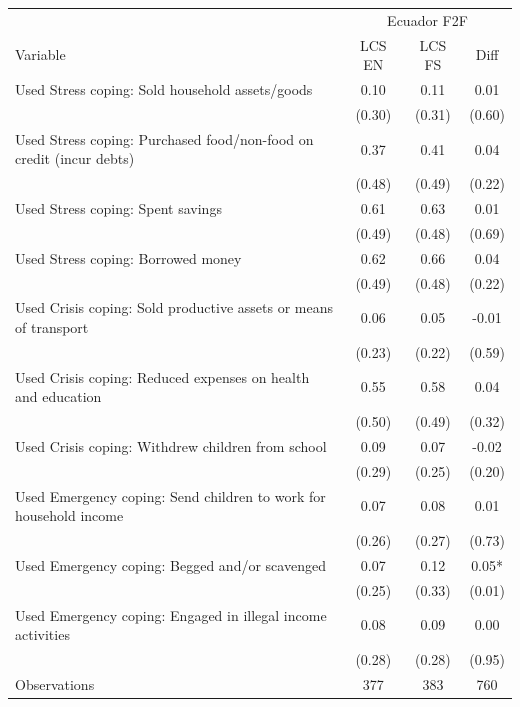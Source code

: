 \begin{tabular}{l*{3}c}
\hline\hline
 & \multicolumn{3}{c}{Ecuador F2F}\\ 
Variable & LCS EN & LCS FS & Diff \\
\hline
Used Stress coping: Sold household assets/goods&0.10&0.11&0.01\\
&(0.30)&(0.31)&(0.60)\\
Used Stress coping: Purchased food/non-food on credit (incur debts)&0.37&0.41&0.04\\
&(0.48)&(0.49)&(0.22)\\
Used Stress coping: Spent savings&0.61&0.63&0.01\\
&(0.49)&(0.48)&(0.69)\\
Used Stress coping: Borrowed money&0.62&0.66&0.04\\
&(0.49)&(0.48)&(0.22)\\
Used Crisis coping: Sold productive assets or means of transport&0.06&0.05&-0.01\\
&(0.23)&(0.22)&(0.59)\\
Used Crisis coping: Reduced expenses on health and education&0.55&0.58&0.04\\
&(0.50)&(0.49)&(0.32)\\
Used Crisis coping: Withdrew children from school&0.09&0.07&-0.02\\
&(0.29)&(0.25)&(0.20)\\
Used Emergency coping: Send children to work for household income&0.07&0.08&0.01\\
&(0.26)&(0.27)&(0.73)\\
Used Emergency coping: Begged and/or scavenged&0.07&0.12&0.05*\\
&(0.25)&(0.33)&(0.01)\\
Used Emergency coping: Engaged in illegal income activities&0.08&0.09&0.00\\
&(0.28)&(0.28)&(0.95)\\
\hline
Observations & 377 & 383 & 760 \\
\hline\hline
\end{tabular}

